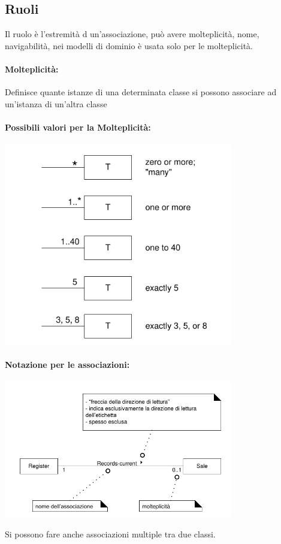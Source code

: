 \documentclass[12pt, a4paper, openany, twoside]{book}
\begin{document}
\subsection{Ruoli}
Il ruolo è l'estremità d un'associazione, può avere molteplicità, nome, 
navigabilità, nei modelli di dominio è usata solo per le molteplicità.
\paragraph{Molteplicità:} Definisce quante istanze di una determinata classe si
possono associare ad un'istanza di un'altra classe
\paragraph{Possibili valori per la Molteplicità: }
\begin{center}
\includegraphics[width=0.75\textwidth]{9}
\end{center}
\paragraph{Notazione per le associazioni:}
\begin{center}
\includegraphics[width=0.75\textwidth]{10}
\end{center}
Si possono fare anche associazioni multiple tra due classi. 
\end{document}
